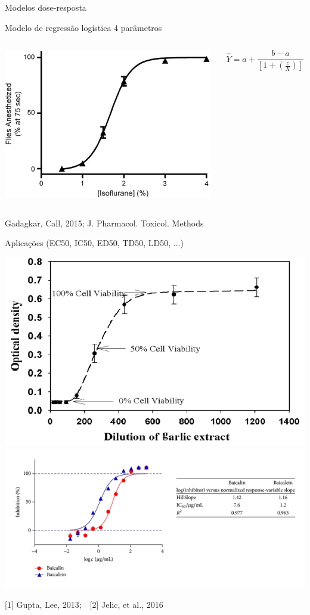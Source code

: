 \documentclass{beamer}
\begin{document}
\begin{frame}{\scriptsize Modelos dose-resposta}
  \begin{block}{\scriptsize Modelo de regressão logística 4 parâmetros}
    \begin{columns}
      \begin{column}{5cm}
        \begin{center}
          \includegraphics[width=.5\textwidth]{Cap18-19/Dose-response-Hill-eq}
        \end{center}
      \end{column}
      \begin{column}{5cm}
        \tiny

        $$\hat{Y} = a + \frac{b-a}{\left[ 1 + \left(\frac{c}{X}\right)\right]}$$
      \end{column}
    \end{columns}
    {\hfill \tiny Gadagkar, Call, 2015; J. Pharmacol. Toxicol. Methods}
  \end{block}
  \begin{block}{\scriptsize Aplicações (EC50, IC50, ED50, TD50, LD50, ...)}
    \footnotesize
    \begin{center}
      \includegraphics[width=.35\textwidth]{Cap18-19/Dose-response-curve-of-aqueous-garlic-extract-on-viability-of-Mus-musculus-colon}
      \includegraphics[height=.3\textheight]{Cap18-19/Dose-response-curves-and-IC50-values-of-Src-kinase-inhibition-for-baicalin-and-baicalein}
    \end{center}
    {\hfill \tiny [1] Gupta, Lee, 2013;\ \ [2] Jelic, et al., 2016}
  \end{block}
\end{frame}
\end{document}
